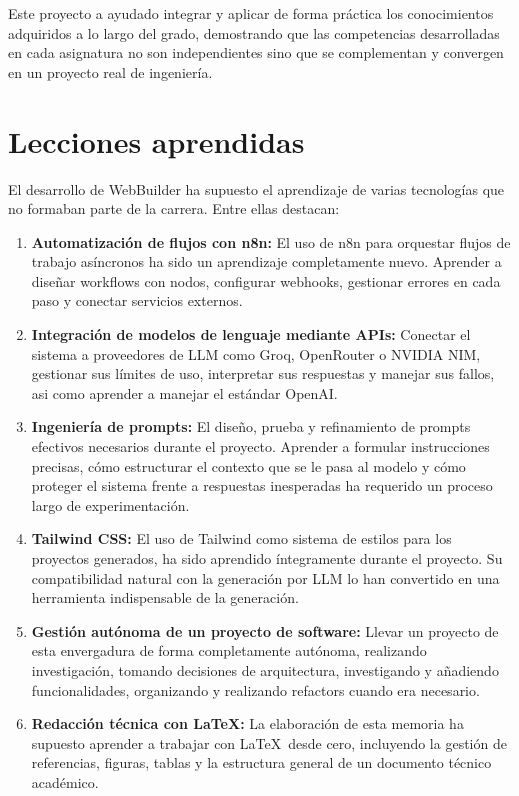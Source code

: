 Este proyecto a ayudado integrar y aplicar de forma práctica los conocimientos adquiridos a lo largo del grado, demostrando que las competencias desarrolladas en cada asignatura no son independientes sino que se complementan y convergen en un proyecto real de ingeniería.

\section{Lecciones aprendidas}
\label{sec:lecciones_aprendidas}

El desarrollo de WebBuilder ha supuesto el aprendizaje de varias tecnologías que no formaban parte de la carrera. Entre ellas destacan:

\begin{enumerate}
  \item \textbf{Automatización de flujos con n8n:} El uso de n8n para orquestar flujos de trabajo asíncronos ha sido un aprendizaje completamente nuevo. Aprender a diseñar workflows con nodos, configurar webhooks, gestionar errores en cada paso y conectar servicios externos.
   
  \item \textbf{Integración de modelos de lenguaje mediante APIs:} Conectar el sistema a proveedores de LLM como Groq, OpenRouter o NVIDIA NIM, gestionar sus límites de uso, interpretar sus respuestas y manejar sus fallos, asi como aprender a manejar el estándar OpenAI.
  
  \item \textbf{Ingeniería de prompts:} El diseño, prueba y refinamiento de prompts efectivos necesarios durante el proyecto. Aprender a formular instrucciones precisas, cómo estructurar el contexto que se le pasa al modelo y cómo proteger el sistema frente a respuestas inesperadas ha requerido un proceso largo de experimentación.
  
  \item \textbf{Tailwind CSS:} El uso de Tailwind como sistema de estilos para los proyectos generados, ha sido aprendido íntegramente durante el proyecto. Su compatibilidad natural con la generación por LLM lo han convertido en una herramienta indispensable de la generación.
  
  \item \textbf{Gestión autónoma de un proyecto de software:} Llevar un proyecto de esta envergadura de forma completamente autónoma, realizando investigación, tomando decisiones de arquitectura, investigando y añadiendo funcionalidades, organizando y realizando refactors cuando era necesario.
  
  \item \textbf{Redacción técnica con \LaTeX:} La elaboración de esta memoria ha supuesto aprender a trabajar con \LaTeX\ desde cero, incluyendo la gestión de referencias, figuras, tablas y la estructura general de un documento técnico académico.
\end{enumerate}

